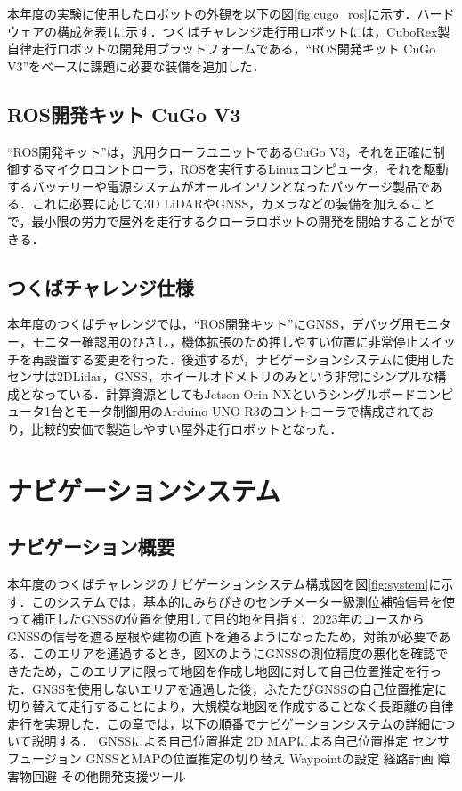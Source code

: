 \documentclass[platex,dvipdfmx]{rbproceedings}
\begin{document}
本年度の実験に使用したロボットの外観を以下の図\ref{fig:cugo_ros}に示す．ハードウェアの構成を表1に示す．つくばチャレンジ走行用ロボットには，CuboRex製自律走行ロボットの開発用プラットフォームである，“ROS開発キット CuGo V3”をベースに課題に必要な装備を追加した．
\subsection{ROS開発キット CuGo V3}
“ROS開発キット”は，汎用クローラユニットであるCuGo V3，それを正確に制御するマイクロコントローラ，ROSを実行するLinuxコンピュータ，それを駆動するバッテリーや電源システムがオールインワンとなったパッケージ製品である．これに必要に応じて3D LiDARやGNSS，カメラなどの装備を加えることで，最小限の労力で屋外を走行するクローラロボットの開発を開始することができる．



\subsection{つくばチャレンジ仕様}
本年度のつくばチャレンジでは，“ROS開発キット”にGNSS，デバッグ用モニター，モニター確認用のひさし，機体拡張のため押しやすい位置に非常停止スイッチを再設置する変更を行った．後述するが，ナビゲーションシステムに使用したセンサは2DLidar，GNSS，ホイールオドメトリのみという非常にシンプルな構成となっている．計算資源としてもJetson Orin NXというシングルボードコンピュータ1台とモータ制御用のArduino UNO R3のコントローラで構成されており，比較的安価で製造しやすい屋外走行ロボットとなった．

\section{ナビゲーションシステム}
\subsection{ナビゲーション概要}
本年度のつくばチャレンジのナビゲーションシステム構成図を図\ref{fig:system}に示す．このシステムでは，基本的にみちびきのセンチメーター級測位補強信号を使って補正したGNSSの位置を使用して目的地を目指す．2023年のコースからGNSSの信号を遮る屋根や建物の直下を通るようになったため，対策が必要である．このエリアを通過するとき，図XのようにGNSSの測位精度の悪化を確認できたため，このエリアに限って地図を作成し地図に対して自己位置推定を行った．GNSSを使用しないエリアを通過した後，ふたたびGNSSの自己位置推定に切り替えて走行することにより，大規模な地図を作成することなく長距離の自律走行を実現した．この章では，以下の順番でナビゲーションシステムの詳細について説明する．
GNSSによる自己位置推定
2D MAPによる自己位置推定
センサフュージョン
GNSSとMAPの位置推定の切り替え
Waypointの設定
経路計画
障害物回避
その他開発支援ツール
\end{document}
